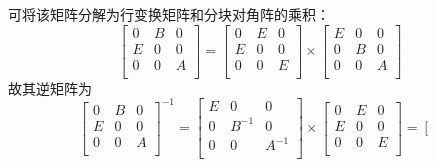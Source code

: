 \documentclass{article}
\begin{document}
\begin{spacing}{1.5}
\begin{enumerate}
    可将该矩阵分解为行变换矩阵和分块对角阵的乘积：
    \begin{equation*}
        \left[
            \begin{array}{ccc}
                0 & B & 0 \\
                E & 0 & 0 \\
                0 & 0 & A \\
            \end{array}
        \right]
        = 
        \left[
            \begin{array}{ccc}
                0 & E & 0 \\
                E & 0 & 0 \\
                0 & 0 & E \\
            \end{array}
        \right]
        \times
        \left[
            \begin{array}{ccc}
                E & 0 & 0 \\
                0 & B & 0 \\
                0 & 0 & A \\
            \end{array}
        \right]
    \end{equation*}
    故其逆矩阵为 
    \begin{equation*}
        \left[
            \begin{array}{ccc}
                0 & B & 0 \\
                E & 0 & 0 \\
                0 & 0 & A \\
            \end{array}
        \right]^{-1}
        =
        \left[
            \begin{array}{ccc}
                E & 0 & 0 \\
                0 & B^{-1} & 0 \\
                0 & 0 & A^{-1} \\
            \end{array}
        \right]
        \times
        \left[
            \begin{array}{ccc}
                0 & E & 0 \\
                E & 0 & 0 \\
                0 & 0 & E \\
            \end{array}
        \right]
        =
        \left[
            \begin{array}{ccc}

\end{array}
\end{equation*}
\end{enumerate}
\end{spacing}
\end{document}
